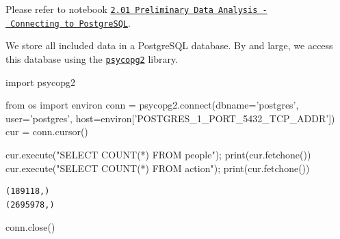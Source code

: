 \documentclass[]{report}
\newenvironment{Shaded}{}{}
\newcommand{\StringTok}[1]{\textcolor[rgb]{0.25,0.44,0.63}{{#1}}}
\newcommand{\ImportTok}[1]{{#1}}
\newcommand{\OperatorTok}[1]{\textcolor[rgb]{0.40,0.40,0.40}{{#1}}}
\newcommand{\BuiltInTok}[1]{{#1}}
\newcommand{\ExtensionTok}[1]{{#1}}
\newcommand{\NormalTok}[1]{{#1}}
\begin{document}
Please refer to notebook
\href{http://joshuacook.me:8003/notebooks/ipynb/2.01\%20Preliminary\%20Data\%20Analysis\%20-\%20Connecting\%20to\%20PostgreSQL.ipynb}{\texttt{2.01\ Preliminary\ Data\ Analysis\ -\ Connecting\ to\ PostgreSQL}}.

We store all included data in a PostgreSQL database. By and large, we
access this database using the
\href{http://initd.org/psycopg/docs/}{\texttt{psycopg2}} library.

\begin{Shaded}
\begin{Highlighting}[]
\ImportTok{import} \NormalTok{psycopg2}

\ImportTok{from} \NormalTok{os }\ImportTok{import} \NormalTok{environ}
\NormalTok{conn }\OperatorTok{=} \NormalTok{psycopg2.}\ExtensionTok{connect}\NormalTok{(dbname}\OperatorTok{=}\StringTok{'postgres'}\NormalTok{, }
                        \NormalTok{user}\OperatorTok{=}\StringTok{'postgres'}\NormalTok{,}
                        \NormalTok{host}\OperatorTok{=}\NormalTok{environ[}\StringTok{'POSTGRES_1_PORT_5432_TCP_ADDR'}\NormalTok{])}
\NormalTok{cur }\OperatorTok{=} \NormalTok{conn.cursor()}
\end{Highlighting}
\end{Shaded}

\begin{Shaded}
\begin{Highlighting}[]
\NormalTok{cur.execute(}\StringTok{"SELECT COUNT(*) FROM people"}\NormalTok{)}\OperatorTok{;} \BuiltInTok{print}\NormalTok{(cur.fetchone())}
\NormalTok{cur.execute(}\StringTok{"SELECT COUNT(*) FROM action"}\NormalTok{)}\OperatorTok{;} \BuiltInTok{print}\NormalTok{(cur.fetchone())}
\end{Highlighting}
\end{Shaded}

\begin{verbatim}
(189118,)
(2695978,)
\end{verbatim}

\begin{Shaded}
\begin{Highlighting}[]
\NormalTok{conn.close()}
\end{Highlighting}
\end{Shaded}
\end{document}
